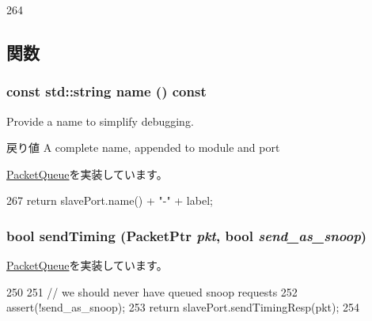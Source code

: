 \begin{DoxyCode}
264 { }
\end{DoxyCode}


\subsection{関数}
\hypertarget{classSlavePacketQueue_a6490f765a824ced1cc94979609fe7e07}{
\subsubsection[{name}]{\setlength{\rightskip}{0pt plus 5cm}const std::string name () const}}
\label{classSlavePacketQueue_a6490f765a824ced1cc94979609fe7e07}
Provide a name to simplify debugging.

\begin{DoxyReturn}{戻り値}
A complete name, appended to module and port 
\end{DoxyReturn}


\hyperlink{classPacketQueue_a2d319721a65496069642871a52e47056}{PacketQueue}を実装しています。


\begin{DoxyCode}
267     { return slavePort.name() + "-" + label; }
\end{DoxyCode}
\hypertarget{classSlavePacketQueue_a49e787c20f2f8d3e4fc0b8213bebcfc4}{
\subsubsection[{sendTiming}]{\setlength{\rightskip}{0pt plus 5cm}bool sendTiming ({\bf PacketPtr} {\em pkt}, \/  bool {\em send\_\-as\_\-snoop})}}
\label{classSlavePacketQueue_a49e787c20f2f8d3e4fc0b8213bebcfc4}


\hyperlink{classPacketQueue_a3111a75f1ac04df57de8a34ded64a82d}{PacketQueue}を実装しています。


\begin{DoxyCode}
250 {
251     // we should never have queued snoop requests
252     assert(!send_as_snoop);
253     return slavePort.sendTimingResp(pkt);
254 }
\end{DoxyCode}


